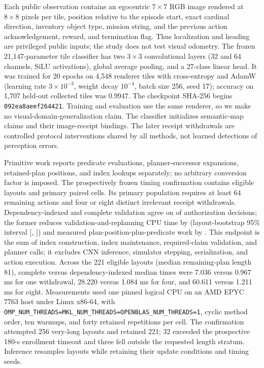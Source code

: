 \documentclass{article}
\begin{document}
Each public observation contains an egocentric $7\times7$ RGB image rendered
at $8\times8$ pixels per tile, position relative to the episode start, exact
cardinal direction, inventory object type, mission string, and the previous
action acknowledgement, reward, and termination flag. Thus localization and
heading are privileged public inputs; the study does not test visual odometry.
The frozen 21,147-parameter tile classifier has two $3\times3$ convolutional
layers (32 and 64 channels, SiLU activations), global average pooling, and a
27-class linear head. It was trained for 20 epochs on 4,548 renderer tiles with
cross-entropy and AdamW (learning rate $3\times10^{-3}$, weight decay
$10^{-4}$, batch size 256, seed 17); accuracy on 1,707 held-out collected tiles
was 0.9947. The checkpoint SHA-256 begins
\texttt{092ea8aeef264421}. Training and evaluation use the same renderer, so
we make no visual-domain-generalization claim. The classifier initializes
semantic-map claims and their image-receipt bindings. The later receipt
withdrawals are controlled protocol interventions shared by all methods, not
learned detections of perception errors.



Primitive work reports predicate evaluations, planner-successor expansions,
retained-plan positions, and index lookups separately; no arbitrary conversion
factor is imposed. The prospectively frozen timing confirmation contains
\AmortizedEligible{} eligible layouts and \AmortizedPairedCells{} primary paired
cells. Its primary population requires at least 64 remaining actions and four
or eight distinct irrelevant receipt withdrawals. Dependency-indexed and
complete validation agree on \AmortizedAgreement{} of authorization decisions;
the former reduces validation-and-replanning CPU time by
\AmortizedReduction{} (layout-bootstrap 95\% interval
[\AmortizedReductionLow{}, \AmortizedReductionHigh{}]) and measured
plan-position-plus-predicate work by \AmortizedWorkReduction{}. This endpoint
is the sum of index construction, index maintenance, required-claim validation,
and planner calls; it excludes CNN inference, simulator stepping, serialization,
and action execution. Across the 221 eligible layouts (median remaining-plan
length 81), complete versus dependency-indexed median times were
7.036 versus 0.967 ms for one withdrawal, 28.220 versus 1.084 ms for four, and
60.611 versus 1.211 ms for eight. Measurements used one pinned logical CPU on
an AMD EPYC 7763 host under Linux x86-64, with
\texttt{OMP\_NUM\_THREADS=MKL\_NUM\_THREADS=OPENBLAS\_NUM\_THREADS=1},
cyclic method order, ten warmups, and forty retained repetitions per cell.
The confirmation attempted 256 very-long layouts and retained 221; 32 exceeded
the prospective 180-s enrollment timeout and three fell outside the requested
length stratum. Inference resamples layouts while retaining their update
conditions and timing seeds.
\end{document}
